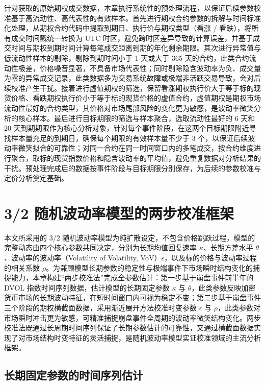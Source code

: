 针对获取的原始期权成交数据，本章执行系统性的预处理流程，以保证后续参数校准基于高流动性、高代表性的有效样本。首先进行期权合约参数的拆解与时间标准化处理，从期权合约代码中提取到期日、执行价与期权类型（看涨 / 看跌），将所有成交时间戳统一转换为 UTC 时区，避免跨时区差异导致的计算误差，并基于成交时间与期权到期时间计算每笔成交距离到期的年化剩余期限。其次进行异常值与低流动性样本的剔除，剔除到期时间小于 1 天或大于 365 天的合约，此类合约流动性极差，价格噪音显著，不具备市场代表性；同时剔除隐含波动率为负、成交量为零的异常成交记录，此类数据多为交易系统故障或极端非活跃交易导致，会对后续校准产生干扰。接着进行虚值期权的筛选，保留看涨期权执行价大于等于标的现货价格、看跌期权执行价小于等于标的现货价格的虚值合约，虚值期权是期权市场流动性最好的合约类型，其价格对市场尾部风险的变化更为敏感，是波动率微笑分析的核心样本。最后进行目标期限的筛选与样本聚合，选取流动性最好的 6 天和 20 天到期期限作为核心分析对象，针对每个事件阶段，在这两个目标期限附近寻找样本量充足的到期日，确保每个期限的有效样本量不少于 3 个，以保证后续波动率微笑拟合的可靠性；对同一合约在同一时间窗口内的多笔成交，按合约维度进行聚合，取标的现货指数价格和隐含波动率的平均值，避免重复数据对分析结果的干扰。预处理完成后的数据按事件阶段与目标期限分别保存，为后续的参数校准与定价分析奠定基础。

\section{ 3/2 随机波动率模型的两步校准框架}

本文所采用的 3/2 随机波动率模型为纯扩散设定，不包含价格跳跃过程，模型的完整动态由四个核心参数共同决定，分别为长期均值回复速率 $\kappa$、长期方差水平 $\theta$、波动率的波动率（Volatility of Volatility, VoV）$\epsilon$，以及标的价格与波动率过程的相关系数 $\rho$。为兼顾模型长期参数的稳定性与极端事件下市场瞬时结构变化的捕捉能力，本章构建“两步校准法”完成全参数估计：第一步基于崩盘事件前半年的 DVOL 指数时间序列数据，估计模型的长期固定参数 $\kappa$ 与 $\theta$，此类参数反映加密货币市场的长期波动特征，在短时间窗口内可视为稳定不变；第二步基于崩盘事件三个阶段的期权横截面数据，采用渐近展开方法校准时变参数 $\epsilon$ 与 $\rho$，此类参数对市场瞬时冲击更为敏感，可精准捕捉崩盘事件全周期的波动率微笑结构变化。两步校准法既通过长周期时间序列保证了长期参数估计的可靠性，又通过横截面数据实现了对市场结构时变特征的灵活捕捉，是随机波动率模型实证校准领域的主流分析框架\citet{andersenModelingForecastingRealized2003}。

\subsection{ 长期固定参数的时间序列估计 }


